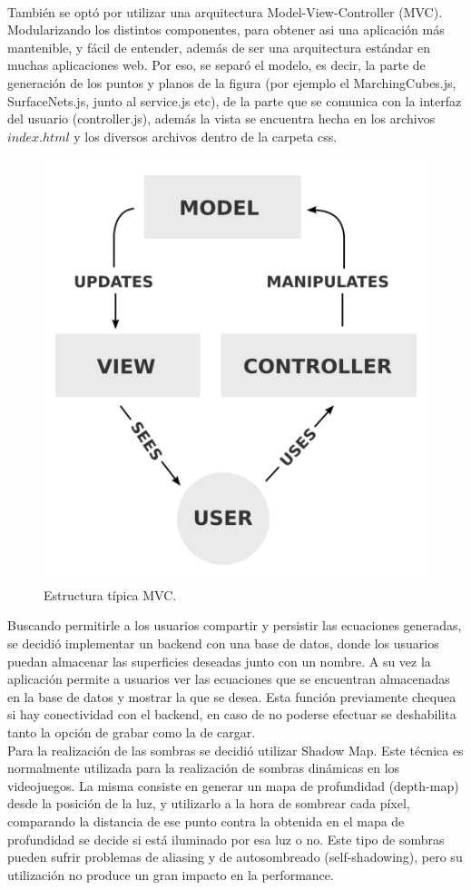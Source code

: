 \documentclass[12pt]{article}
\begin{document}
\\También se optó por utilizar una arquitectura Model-View-Controller (MVC). Modularizando los distintos componentes, para obtener asi una aplicación más mantenible, y fácil de entender, además de ser una arquitectura estándar en muchas aplicaciones web. Por eso, se separó el modelo, es decir, la parte de generación de los puntos y planos de la figura (por ejemplo el MarchingCubes.js, SurfaceNets.js, junto al service.js etc), de la parte que se comunica con la interfaz del usuario (controller.js), además la vista se encuentra hecha en los archivos $index.html$ y los diversos archivos dentro de la carpeta css.
\clearpage
\begin{figure}[h!]
\includegraphics[width =0.4\linewidth, center]{mvc.png}
\caption{Estructura típica MVC.}
\label{ fig : surface }
\end{figure}
Buscando permitirle a los usuarios compartir y persistir las ecuaciones generadas, se decidió implementar un backend con una base de datos, donde los usuarios puedan almacenar las superficies deseadas junto con un nombre. A su vez la aplicación permite a usuarios ver las ecuaciones que se encuentran almacenadas en la base de datos y mostrar la que se desea. Esta función previamente chequea si hay conectividad con el backend, en caso de no poderse efectuar se deshabilita tanto la opción de grabar como la de cargar.
\\Para la realización de las sombras se decidió utilizar Shadow Map\cite{shadowmap}\cite{realtimerendering}. Este técnica es normalmente utilizada para la realización de sombras dinámicas en los videojuegos\cite{engine}\cite{realtimerendering}. La misma consiste en generar un mapa de profundidad (depth-map) desde la posición de la luz, y utilizarlo a la hora de sombrear cada píxel, comparando la distancia de ese punto contra la obtenida en el mapa de profundidad se decide si está iluminado por esa luz o no. Este tipo de sombras pueden sufrir problemas de aliasing y de autosombreado (self-shadowing)\cite{realtimerendering}, pero su utilización no produce un gran impacto en la performance.
\end{document}
